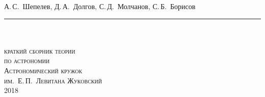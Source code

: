 \thispagestyle{empty}
\begin{center}
	{\sffamily \large А.\,С.~Шепелев, Д.\,А.~Долгов, С.\,Д.~Молчанов, С.\,Б.~Борисов}\\[-7pt]
	
	\rule{0.88\tw}{0.7pt} \\[12pc]

	
	
	\scalebox{2}{\Huge \bfseries \scshape Астрадь}\\[1pc]
	{\Large \scshape краткий сборник теории\\[.5pc] по астрономии}\\[4pc]
	\vfill
	{\scshape Астрономический кружок\\ им.~Е.\,П.~Левитана}
	\vfill
	{\scshape Жуковский \\ 2018}
\end{center}